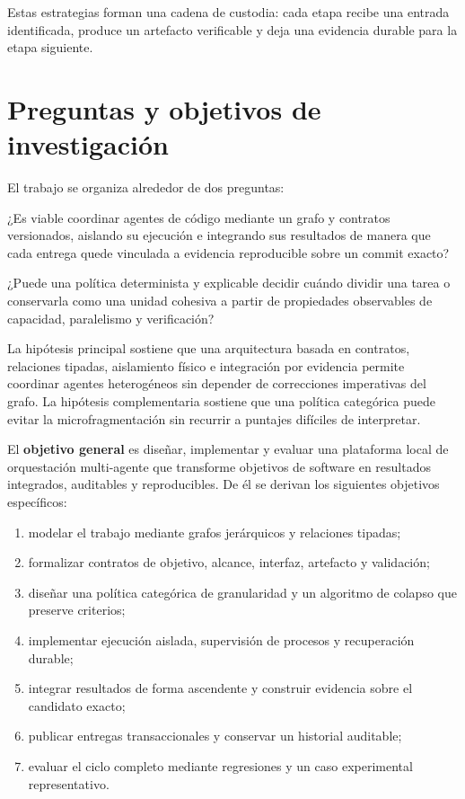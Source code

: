 Estas estrategias forman una cadena de custodia: cada etapa recibe una entrada
identificada, produce un artefacto verificable y deja una evidencia durable para
la etapa siguiente.

\section{Preguntas y objetivos de investigación}

El trabajo se organiza alrededor de dos preguntas:

\begin{description}[leftmargin=1.8cm,style=nextline]
  \item[\textbf{PI-1}] ¿Es viable coordinar agentes de código mediante un grafo
  y contratos versionados, aislando su ejecución e integrando sus resultados de
  manera que cada entrega quede vinculada a evidencia reproducible sobre un
  commit exacto?
  \item[\textbf{PI-2}] ¿Puede una política determinista y explicable decidir
  cuándo dividir una tarea o conservarla como una unidad cohesiva a partir de
  propiedades observables de capacidad, paralelismo y verificación?
\end{description}

La hipótesis principal sostiene que una arquitectura basada en contratos,
relaciones tipadas, aislamiento físico e integración por evidencia permite
coordinar agentes heterogéneos sin depender de correcciones imperativas del
grafo. La hipótesis complementaria sostiene que una política categórica puede
evitar la microfragmentación sin recurrir a puntajes difíciles de interpretar.

El \textbf{objetivo general} es diseñar, implementar y evaluar una plataforma
local de orquestación multi-agente que transforme objetivos de software en
resultados integrados, auditables y reproducibles. De él se derivan los
siguientes objetivos específicos:

\begin{enumerate}
  \item modelar el trabajo mediante grafos jerárquicos y relaciones tipadas;
  \item formalizar contratos de objetivo, alcance, interfaz, artefacto y
  validación;
  \item diseñar una política categórica de granularidad y un algoritmo de
  colapso que preserve criterios;
  \item implementar ejecución aislada, supervisión de procesos y recuperación
  durable;
  \item integrar resultados de forma ascendente y construir evidencia sobre el
  candidato exacto;
  \item publicar entregas transaccionales y conservar un historial auditable;
  \item evaluar el ciclo completo mediante regresiones y un caso experimental
  representativo.
\end{enumerate}

